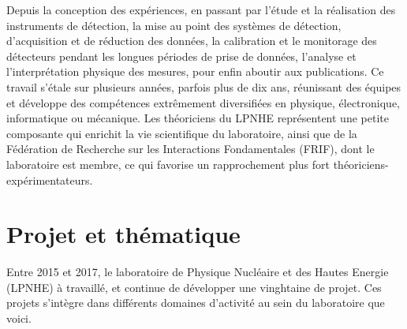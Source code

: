 \documentclass[french,a4paper,12pt]{report}
\begin{document}
  Depuis la conception des expériences, en passant par l’étude et la réalisation des instruments de détection, la mise au point des systèmes de détection, d’acquisition et de réduction des données, la calibration et le monitorage des détecteurs pendant les longues périodes de prise de données, l’analyse et l’interprétation physique des mesures, pour enfin aboutir aux publications.
  Ce travail s'étale sur plusieurs années, parfois plus de dix ans, réunissant des équipes et développe des compétences extrêmement diversifiées en physique, électronique, informatique ou mécanique. 
  Les théoriciens du LPNHE représentent une petite composante qui enrichit la vie scientifique du laboratoire, ainsi que de la Fédération de Recherche sur les Interactions Fondamentales (FRIF), dont le laboratoire est membre, ce qui favorise un rapprochement plus fort théoriciens-expérimentateurs.
  
  \newpage
  
  \section{Projet et thématique}
  
		Entre 2015 et 2017, le laboratoire de Physique Nucléaire et des Hautes Energie (LPNHE) à travaillé, et continue de développer une vinghtaine de projet. Ces projets s'intègre dans différents domaines d'activité au sein du laboratoire que voici.
  	
\end{document}

